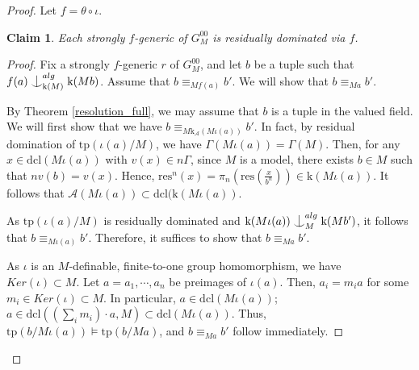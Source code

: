 \documentclass[12pt]{article}
\newcommand{\tpp}{\mathrm{tp}}
\newcommand{\res}{\mathrm{res}}
\newcommand{\dcl}{\mathrm{dcl}}
\newcommand{\val}{\textit{v}}
\newcommand{\0}{\emptyset}
\newcommand{\rf}{\mathrm{k}}
\newcommand{\A}{\mathcal{A}}
\def\forkindep{\mathrel{\raise0.2ex\hbox{\ooalign{\hidewidth$\vert$\hidewidth\cr\raise-0.9ex\hbox{$\smile$}}}}}
\theoremstyle{plain}%
\newtheorem{claim}{Claim}
\theoremstyle{definition}
\theoremstyle{remark}
\begin{document}
\begin{proof}
Let $f=\theta\circ \iota$.

\begin{claim}\label{claim2_homres}
        Each strongly $f$-generic of $G_M^{00}$ is residually dominated \emph{via $f$.} 
\end{claim}
\begin{proof}
    Fix a strongly $f$-generic $r$ of $G_M^{00}$, and let $b$ be a tuple such that $f(a)\forkindep_{\rf(M)}^{alg}\rf(Mb)$. Assume that $b\equiv_{Mf(a)} b'$. We will show that $b\equiv_{Ma}b'$. 
   
  By Theorem \ref{resolution_full}, we may assume that $b$ is a tuple in the valued field. We will first show that we have $b \equiv_{M\rf_{\A}(M\iota(a))} b'$. 
  In fact, by residual domination of $\tpp(\iota(a)/M)$, we have $\Gamma(M\iota(a)) = \Gamma(M)$. 
Then, for any $x \in \dcl(M\iota(a))$ with $\val(x) \in n\Gamma$, since $M$ is a model, there exists $b \in M$ such that $n\val(b) = \val(x)$. 
  Hence, $\res^n(x) = \pi_n\left(\res\left(\frac{x}{b^n}\right)\right) \in \rf(M\iota(a)) %
  .$ It follows that $\A(M\iota(a))\subset \dcl(\rf(M\iota(a))$.

As $\tpp(\iota(a)/M)$ is residually dominated and $\rf(M\iota(a))\forkindep_M^{alg}\rf(Mb')$, it follows that $b \equiv_{M\iota(a)} b'$. Therefore, it suffices to show that $b \equiv_{Ma} b'$.

   As $\iota$ is an $M$-definable, finite-to-one group homomorphism, we have $Ker(\iota)\subset M$. Let $a=a_1, \cdots, a_n$ be preimages of $\iota(a)$. Then, $a_i=m_ia$ for some $m_i\in Ker(\iota)\subset M$. In particular, $a\in \dcl(M\iota(a))$; $a\in \dcl((\sum_{i}m_i)\cdot a,M)\subset \dcl(M\iota(a))$. Thus, $\tpp(b/M\iota(a))\models \tpp(b/Ma)$, and $b\equiv_{Ma}b'$ follow immediately. \end{proof}
   

 


\end{proof}
\end{document}
